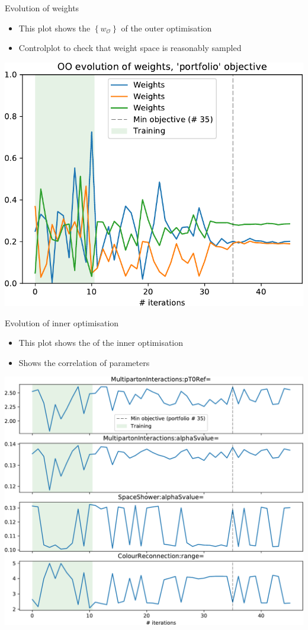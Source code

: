 \begin{frame}{Evolution of weights}
    \begin{itemize}
        \item This plot shows the $\left\{w_\mathcal{O}\right\}$  of the outer optimisation
        \item Controlplot to check that weight space is reasonably sampled
    \end{itemize}
    \begin{center}
        \includegraphics[width=.78\textwidth]{oo/chain-3-report-wevolution.pdf}
    \end{center}
\end{frame}

\begin{frame}{Evolution of inner optimisation}
    \begin{itemize}
        \item This plot shows the \phat of the inner optimisation
        \item Shows the correlation of parameters
    \end{itemize}
    \begin{center}
        \includegraphics[width=.78\textwidth]{oo/chain-3-report-pevolution.pdf}
    \end{center}
\end{frame}

